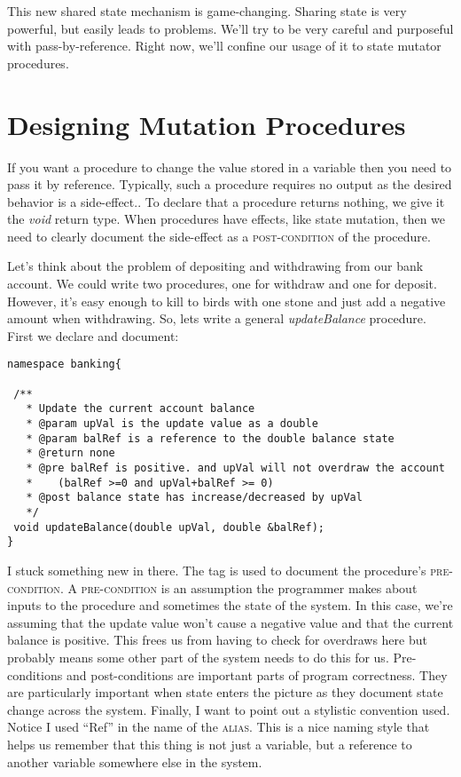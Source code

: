 This new shared state mechanism is game-changing.  Sharing state is very powerful, but easily leads to problems. We'll try to be very careful and purposeful with pass-by-reference. Right now, we'll confine our usage of it to state mutator procedures. 

\section{Designing Mutation Procedures}

If you want a procedure to change the value stored in a variable then you need to pass it by reference. Typically, such a procedure requires no output as the desired behavior is a side-effect.. To declare that a procedure returns nothing, we give it the \textit{void} return type. When procedures have effects, like state mutation, then we need to clearly document the side-effect as a \textsc{post-condition} of the procedure. 

Let's think about the problem of depositing and withdrawing from our bank account. We could write two procedures, one for withdraw and one for deposit. However, it's easy enough to kill to birds with one stone and just add a negative amount when withdrawing. So, lets write a general \textit{updateBalance} procedure. First we declare and document:
\begin{verbatim}
namespace banking{

 /**
   * Update the current account balance
   * @param upVal is the update value as a double
   * @param balRef is a reference to the double balance state
   * @return none
   * @pre balRef is positive. and upVal will not overdraw the account
   *    (balRef >=0 and upVal+balRef >= 0)
   * @post balance state has increase/decreased by upVal
   */
 void updateBalance(double upVal, double &balRef);
}
\end{verbatim}
I stuck something new in there. The \textit{\@pre} tag is used to document the procedure's \textsc{pre-condition}. A \textsc{pre-condition} is an assumption the programmer makes about inputs to the procedure and sometimes the state of the system. In this case, we're assuming that the update value won't cause a negative value and that the current balance is positive. This frees us from having to check for overdraws here but probably means some other part of the system needs to do this for us. Pre-conditions and post-conditions are important parts of program correctness. They are particularly important when state enters the picture as they document state change across the system. Finally, I want to point out a stylistic convention used. Notice I used ``Ref'' in the name of the \textsc{alias}. This is a nice naming style that helps us remember that this thing is not just a variable, but a reference to another variable somewhere else in the system. 

